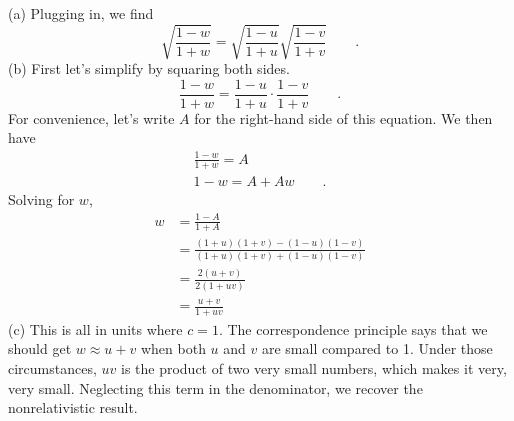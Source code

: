 (a) Plugging in, we find
\begin{equation*}
  \sqrt{\frac{1-w}{1+w}} =   \sqrt{\frac{1-u}{1+u}}   \sqrt{\frac{1-v}{1+v}} \qquad .
\end{equation*}
(b) First let's simplify by squaring both sides.
\begin{equation*}
  \frac{1-w}{1+w} =   \frac{1-u}{1+u}  \cdot \frac{1-v}{1+v} \qquad .
\end{equation*}
For convenience, let's write $A$ for the right-hand side of this equation. We then have
\begin{gather*}
  \frac{1-w}{1+w} = A \\
  1-w = A+Aw \qquad .
\end{gather*}
Solving for $w$,
\begin{align*}
  w &= \frac{1-A}{1+A} \\
    &= \frac{(1+u)(1+v)-(1-u)(1-v)}{(1+u)(1+v)+(1-u)(1-v)} \\
    &= \frac{2(u+v)}{2(1+uv)} \\
    &= \frac{u+v}{1+uv}
\end{align*}
(c) This is all in units where $c=1$. The correspondence principle says that we should get $w\approx u+v$ when
both $u$ and $v$ are small compared to 1. Under those circumstances, $uv$ is the product of two very small
numbers, which makes it very, very small. Neglecting this term in the denominator, we recover the nonrelativistic result.


